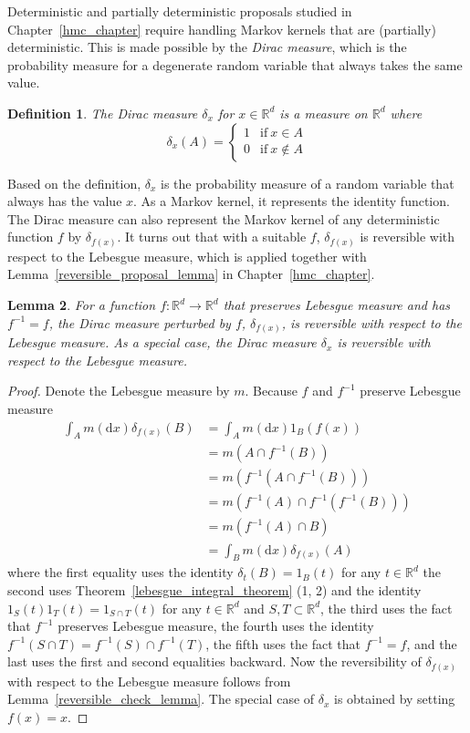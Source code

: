 \documentclass[english,twoside,openright]{HYgraduMLDS}
\newtheorem{lemma}{Lemma}[chapter]
\newtheorem{definition}[lemma]{Definition}
\newcommand{\R}{\mathbb{R}}
\newcommand{\dx}{\mathrm{d}}
\begin{document}
Deterministic and partially deterministic proposals studied in
Chapter~\ref{hmc_chapter} require handling Markov kernels that are (partially)
deterministic. This is made possible by the \emph{Dirac measure}, which is
the probability measure for a degenerate random variable that always takes
the same value.
\begin{definition}
	The Dirac measure \(\delta_{x}\) for \(x\in \R^{d}\) is a measure on \(\R^{d}\)
  where
  \[
    \delta_{x}(A) = \begin{cases}
      1 & \mathrm{if}\  x\in A\\
      0 & \mathrm{if}\  x\notin A
    \end{cases}
  \]
\end{definition}
Based on the definition, \(\delta_{x}\) is the probability measure of a random
variable that always has the value \(x\). As a Markov kernel, it represents
the identity function. The Dirac measure can also represent the Markov kernel
of any deterministic function \(f\) by \(\delta_{f(x)}\). It turns out that
with a suitable \(f\), \(\delta_{f(x)}\) is reversible with respect to the
Lebesgue measure, which is applied together with
Lemma~\ref{reversible_proposal_lemma} in Chapter~\ref{hmc_chapter}.

\begin{lemma}\label{dirac_measure_reversible_lemma}
  For a function \(f\colon \R^{d}\to \R^{d}\) that preserves Lebesgue measure and has
  \(f^{-1} = f\),
	the Dirac measure perturbed by \(f\), \(\delta_{f(x)}\), is reversible
  with respect to the Lebesgue measure. As a special case,
  the Dirac measure \(\delta_{x}\) is reversible with respect to the
  Lebesgue measure.
\end{lemma}
\begin{proof}
  Denote the Lebesgue measure by \(m\). Because \(f\) and \(f^{-1}\) preserve
  Lebesgue measure
	\begin{align*}
    \int_{A}m(\dx x)\delta_{f(x)}(B)
    &= \int_{A}m(\dx x)1_{B}(f(x))
    \\&= m(A\cap f^{-1}(B))
    \\&= m(f^{-1}(A\cap f^{-1}(B)))
    \\&= m(f^{-1}(A)\cap f^{-1}(f^{-1}(B)))
    \\&= m(f^{-1}(A)\cap B)
    \\&= \int_{B}m(\dx x)\delta_{f(x)}(A)
  \end{align*}
  where the first equality uses the identity \(\delta_{t}(B) = 1_{B}(t)\)
  for any \(t\in \R^{d}\) the second uses
  Theorem~\ref{lebesgue_integral_theorem} (1, 2) and the identity
  \(1_{S}(t)1_{T}(t) = 1_{S\cap T}(t)\) for any \(t\in \R^{d}\) and
  \(S, T\subset \R^{d}\),
  the third uses the fact that \(f^{-1}\) preserves Lebesgue measure,
  the fourth uses the identity \(f^{-1}(S\cap T) = f^{-1}(S)\cap f^{-1}(T)\),
  the fifth uses the fact that \(f^{-1} = f\), and the last uses
  the first and second equalities backward.
  Now the reversibility of \(\delta_{f(x)}\) with respect to the Lebesgue measure
  follows from Lemma~\ref{reversible_check_lemma}.
  The special case of \(\delta_{x}\) is obtained by setting \(f(x) = x\).
\end{proof}
\end{document}
